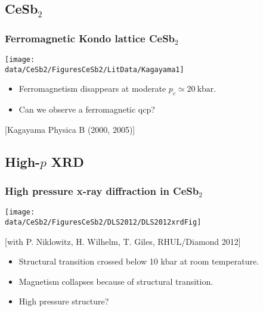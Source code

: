 
\subsection{CeSb$_2$}

\begin{frame}[label=CeSb2Intro]
    \frametitle{Ferromagnetic Kondo lattice CeSb$_2$}
    \centerline{\texttt{[image: \\data/CeSb2/FiguresCeSb2/LitData/Kagayama1]}}
    
    \vspace{1.5em}
    \begin{itemize}
    \item Ferromagnetism disappears at moderate $p_c \simeq \SI{20}{\kilo\bar}$.
    \item Can we observe a ferromagnetic qcp?
    \end{itemize}
    
    \vspace{3 em}
    \centerline{\makebox[\linewidth]{\rule{0.85\textwidth}{0.4pt}}}
    
    \centerline{\scriptsize [Kagayama Physica B (2000, 2005)]}
    
    \end{frame}
    
\subsection{High-$p$ XRD}
\begin{frame}[label=CeSb2xray]
\frametitle{High pressure x-ray diffraction in CeSb$_2$}
\centerline{\texttt{[image: \\data/CeSb2/FiguresCeSb2/DLS2012/DLS2012xrdFig]} }
\centerline{\small [with P. Niklowitz, H. Wilhelm, T. Giles, RHUL/Diamond 2012]}

\begin{itemize}
\item Structural transition crossed below 10 kbar at room temperature.

\item Magnetism collapses because of structural transition.

\item High pressure structure?
\end{itemize}

\end{frame}
    

